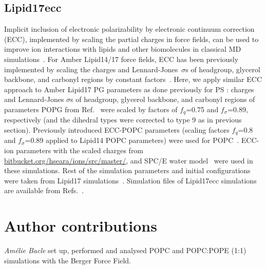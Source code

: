 \documentclass[journal=jpcbfk]{achemso}
\begin{document}
\subsection{Lipid17ecc}
Implicit inclusion of electronic polarizability by electronic continuum correction (ECC),
implemented by scaling the partial charges in force fields, can be used to improve ion interactions with lipids
and other biomolecules in classical MD simulations~\cite{dijon20}.
For Amber Lipid14/17 force fields, ECC has been previously implemented by scaling the
charges and Lennard-Jones~$\sigma$s of headgroup, glycerol backbone, and carbonyl regions
by constant factors~\cite{melcr18,melcr20}.
Here, we apply similar ECC approach to Amber Lipid17 PG parameters as done previously for PS \cite{melcr20}:
charges and Lennard-Jones $\sigma$s of headgroup, glycerol backbone, and carbonyl regions
of parameters POPG from Ref.~ were scaled by factors of $f_q$=0.75 and $f_\sigma$=0.89, respectively
(and the dihedral types were corrected to type 9 as in previous section).
Previously introduced ECC-POPC parameters (scaling factors $f_q$=0.8 and $f_\sigma$=0.89 applied to Lipid14 POPC parameters)
were used for POPC~\cite{melcr18}.
ECC-ion parameters with the scaled charges \cite{pluharova14,kohagen16,martinek18}
from \url{bitbucket.org/hseara/ions/src/master/}, and SPC/E water model~\cite{berendsen87} were used in these simulations. 
Rest of the simulation parameters and initial configurations were taken from Lipid17
simulations~\cite{Lipid17POPCPOPG8020,Lipid17POPCPOPG8020100mMCaCl,Lipid17POPCPOPG80201000mMCaCl,Lipid17POPCPOPG5050,Lipid17POPCPOPG5050100mMCaCl,Lipid17POPCPOPG50501000mMCaCl}.
Simulation files of Lipid17ecc simulations are available from
Refs.~.




\clearpage

\section{Author contributions}
\noindent
{\it Am{\'e}lie Bacle} set up, performed and analysed POPC and POPC:POPE (1:1) simulations with the Berger Force Field.
\end{document}
